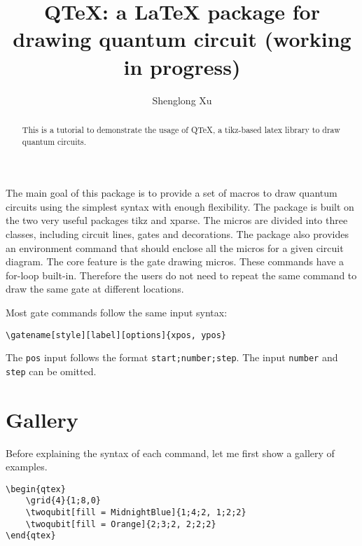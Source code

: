 \documentclass[aps,prl,showpacs,notitlepage,floatfix,superscriptaddress,nofootinbib]{revtex4-2}
\begin{document}
\title{QTeX: a LaTeX package for drawing quantum circuit (working in progress)}
\author{Shenglong Xu}


\begin{abstract}
    This is a tutorial to demonstrate the usage of QTeX, a tikz-based latex library to draw quantum circuits.
\end{abstract}

\maketitle


The main goal of this package is to provide a set of macros to draw quantum circuits using the simplest syntax with enough flexibility. The package is built on the two very useful packages tikz and xparse. The micros are divided into three classes, including circuit lines, gates and decorations. The package also provides an environment command that should enclose all the micros for a given circuit diagram. 
The core feature is the gate drawing micros. These commands have a for-loop built-in. Therefore the users do not need to repeat the same command to draw the same gate at different locations. 


Most gate commands follow the same input syntax:


\begin{verbatim}
\gatename[style][label][options]{xpos, ypos}
\end{verbatim}
The \verb|pos| input follows the format \verb|start;number;step|.
The input \verb|number| and \verb|step| can be omitted.

\section{Gallery}
Before explaining the syntax of each command, let me first show a gallery of examples.

\begin{Code}
\begin{center}
\begin{qtex}
\end{qtex}
\end{center}
\tcblower
\begin{lstlisting}
\begin{qtex}
    \grid{4}{1;8,0}
    \twoqubit[fill = MidnightBlue]{1;4;2, 1;2;2}
    \twoqubit[fill = Orange]{2;3;2, 2;2;2}
\end{qtex}
\end{lstlisting}

\end{Code}
\end{document}
